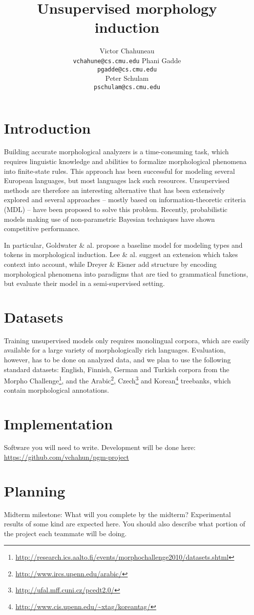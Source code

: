 \documentclass{article}
\title{Unsupervised morphology induction}
\author{
Victor Chahuneau\\
\texttt{vchahune@cs.cmu.edu}
\And
Phani Gadde\\
\texttt{pgadde@cs.cmu.edu} \\
\And
Peter Schulam\\
\texttt{pschulam@cs.cmu.edu}
}
\begin{document}
\maketitle

\section{Introduction}
Building accurate morphological analyzers is a time-consuming task, which requires linguistic knowledge and abilities to formalize morphological phenomena into finite-state rules. This approach has been successful for modeling several European languages, but most languages lack such resources. Unsupervised methods are therefore an interesting alternative that has been extensively explored  and several approaches -- mostly based on information-theoretic criteria (MDL) -- have been proposed to solve this problem. Recently, probabilistic models making use of non-parametric Bayesian techniques have shown competitive performance.

In particular, Goldwater \& al. \cite{goldwater2011} propose a baseline model for modeling types and tokens in morphological induction. Lee \& al. \cite{lee2011} suggest an extension which takes context into account, while Dreyer \& Eisner \cite{dreyer2011} add structure by encoding morphological phenomena into paradigms that are tied to grammatical functions, but evaluate their model in a semi-supervised setting.

\section{Datasets}
Training unsupervised models only requires monolingual corpora, which are easily available for a large variety of morphologically rich languages. Evaluation, however, has to be done on analyzed data, and we plan to use the following standard datasets: English, Finnish, German and Turkish corpora from the Morpho Challenge\footnote{\url{http://research.ics.aalto.fi/events/morphochallenge2010/datasets.shtml}}, and the Arabic\footnote{\url{http://www.ircs.upenn.edu/arabic/}}, Czech\footnote{\url{http://ufal.mff.cuni.cz/pcedt2.0/}} and Korean\footnote{\url{http://www.cis.upenn.edu/~xtag/koreantag/}} treebanks, which contain morphological annotations.

\section{Implementation}
Software you will need to write.
Development will be done here: \url{https://github.com/vchahun/pgm-project}

\section{Planning}
Midterm milestone: What will you complete by the midterm? Experimental results of some kind are expected here. You should also describe what portion of the project each teammate will be doing.



\end{document}
